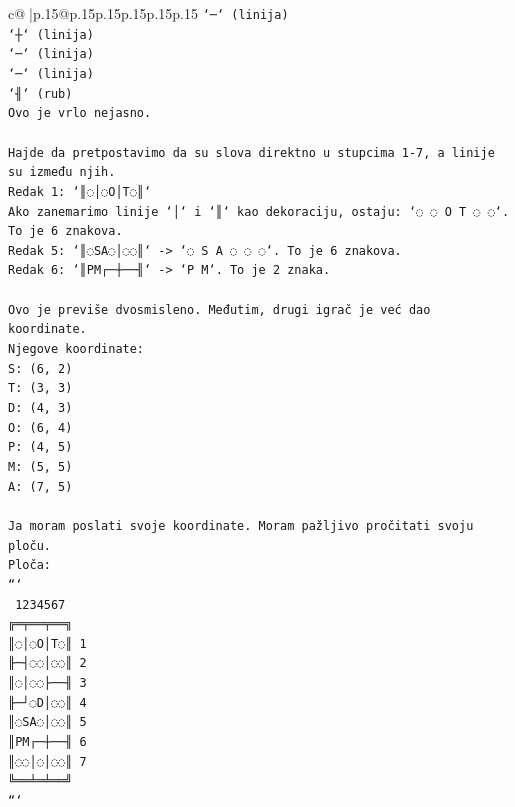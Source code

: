 \documentclass{article}
\begin{document}
{\begin{supertabular}{c@{$\;$}|p{.15\linewidth}@{}p{.15\linewidth}p{.15\linewidth}p{.15\linewidth}p{.15\linewidth}p{.15\linewidth}}
{{{\texttt{`─` (linija)} \\
\texttt{`┼` (linija)} \\
\texttt{`─` (linija)} \\
\texttt{`─` (linija)} \\
\texttt{`╢` (rub)} \\
\texttt{Ovo je vrlo nejasno.} \\
\\ 
\texttt{Hajde da pretpostavimo da su slova direktno u stupcima 1{-}7, a linije su između njih.} \\
\texttt{Redak 1: `║◌│◌O│T◌║`} \\
\texttt{Ako zanemarimo linije `│` i `║` kao dekoraciju, ostaju: `◌ ◌ O T ◌ ◌`. To je 6 znakova.} \\
\texttt{Redak 5: `║◌SA◌│◌◌║` {-}> `◌ S A ◌ ◌ ◌`. To je 6 znakova.} \\
\texttt{Redak 6: `║PM┌─┼──╢` {-}> `P M`. To je 2 znaka.} \\
\\ 
\texttt{Ovo je previše dvosmisleno. Međutim, drugi igrač je već dao koordinate.} \\
\texttt{Njegove koordinate:} \\
\texttt{S: (6, 2)} \\
\texttt{T: (3, 3)} \\
\texttt{D: (4, 3)} \\
\texttt{O: (6, 4)} \\
\texttt{P: (4, 5)} \\
\texttt{M: (5, 5)} \\
\texttt{A: (7, 5)} \\
\\ 
\texttt{Ja moram poslati svoje koordinate. Moram pažljivo pročitati svoju ploču.} \\
\texttt{Ploča:} \\
\texttt{```} \\
\texttt{ 1234567} \\
\texttt{╔═╤══╤══╗} \\
\texttt{║◌│◌O│T◌║ 1} \\
\texttt{╟─┤◌◌│◌◌║ 2} \\
\texttt{║◌│◌◌├──╢ 3} \\
\texttt{╟─┘◌D│◌◌║ 4} \\
\texttt{║◌SA◌│◌◌║ 5} \\
\texttt{║PM┌─┼──╢ 6} \\
\texttt{║◌◌│◌│◌◌║ 7} \\
\texttt{╚══╧═╧══╝} \\
\texttt{```} \\
}}}
\end{supertabular}}
\end{document}
